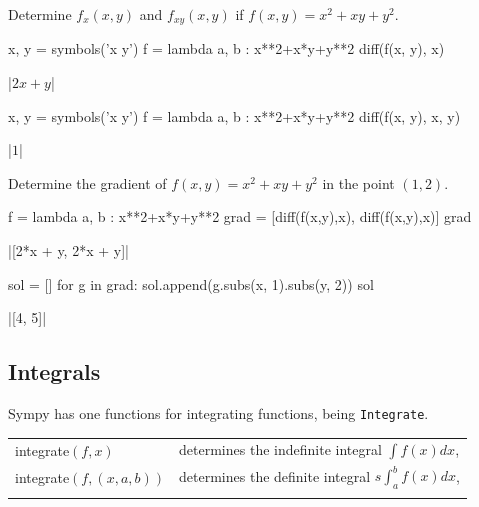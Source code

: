 \begin{example}
Determine $f_x(x,y)$ and $f_{xy}(x,y)$ if $f(x,y) = x^2+xy+y^2$.
	
\begin{pyin}
    x, y = symbols('x y')
    f = lambda a, b : x**2+x*y+y**2
    diff(f(x, y), x)
\end{pyin}
\begin{pyout}
    |$2x+y$|
\end{pyout}
\begin{pyin}
    x, y = symbols('x y')
    f = lambda a, b : x**2+x*y+y**2
    diff(f(x, y), x, y)
\end{pyin}
\begin{pyout}
    |$1$|
\end{pyout}

Determine the gradient of $f(x,y) = x^2+xy+y^2$ in the point $(1,2)$.

\begin{pyin}
    f = lambda a, b : x**2+x*y+y**2
    grad = [diff(f(x,y),x), diff(f(x,y),x)]
    grad
\end{pyin}
\begin{pyout}
    |[2*x + y, 2*x + y]|
\end{pyout}

\begin{pyin}
    sol = []
    for g in grad:
        sol.append(g.subs(x, 1).subs(y, 2))
    sol
\end{pyin}
\begin{pyout}
    |[4, 5]|
\end{pyout}
\end{example}

\subsection{Integrals}
Sympy has one functions for integrating functions, being \lstinline{Integrate}.

\renewcommand{\arraystretch}{2.5}
\begin{tabular}{>{\hfill}p{5cm}p{12cm}}
	integrate$(f,x)$				&			determines the indefinite integral $\int f(x) dx$,\\
	integrate$(f,(x,a,b))$				&			determines the definite integral $ s\int^{b}_{a} f(x) dx$,\\
	\multicolumn{2}{l}{} 
\end{tabular}
\renewcommand{\arraystretch}{1}


